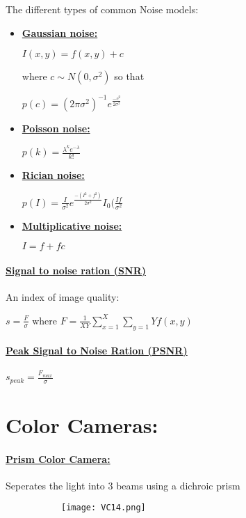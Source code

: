 \documentclass[8pt]{extreport}
\begin{document}
The different types of common Noise models:

\begin{itemize}
\item \textbf{\underline{Gaussian noise:}}
\begin{center}
$I(x,y) = f(x,y) + c$
\end{center}
 where $c \sim N(0,\sigma^2)$ so that 
\begin{center}
$p(c) = (2\pi\sigma^2)^{-1}e^{\frac{-c^2}{2\sigma^2}}$
\end{center}

\item  \textbf{\underline{Poisson noise:}}
\begin{center}
$p(k) = \frac{\lambda^k e^{-\lambda}}{k!}$
\end{center}
\item \textbf{\underline{Rician noise:}}
\begin{center}
$p(I) = \frac{I}{\sigma^2}e^{\frac{-(I^2 + f^2)}{2\sigma^2}}I_0(\frac{If}{\sigma^2}$
\end{center}
\item \textbf{\underline{Multiplicative noise:}}
\begin{center}
$I = f + fc$
\end{center}
\end{itemize}

\paragraph{\underline{Signal to noise ration (SNR)}} An index of image quality:
\begin{center}
$s = \frac{F}{\sigma}$ where $F= \frac{1}{XY}\displaystyle\sum_{x=1}^{X}\displaystyle\sum_{y=1}{Y}f(x,y)$
\end{center}

\paragraph{\underline{Peak Signal to Noise Ration (PSNR)}}
\begin{center}
$s_{peak} = \frac{F_{max}}{\sigma}$
\end{center}

\section{Color Cameras:}

\paragraph{\underline{Prism Color Camera:}} Seperates the light into 3 beams using a dichroic prism
\begin{figure}[H]
\centering
\begin{subfigure}[b]{0.3\linewidth}
\texttt{[image: VC14.png]}
\end{subfigure}
\end{figure}
\end{document}

